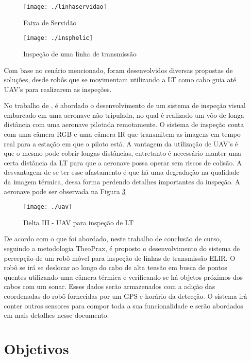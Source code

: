 \begin{figure}[!ht]
	\centering
	\texttt{[image: ./linhaservidao]}
	\caption{Faixa de Servidão} \label{linhaservidao}
\end{figure}

\begin{figure}[!ht]
	\centering
	\texttt{[image: ./insphelic]}
	\caption{Inspeção de uma linha de transmissão} \label{lineinspection}
\end{figure}

Com base no cenário mencionado, foram desenvolvidos diversas propostas de soluções, desde robôs que se movimentam utilizando a LT como cabo guia até UAV's para realizarem as inspeções.

No trabalho de , é abordado o desenvolvimento de um sistema de inspeção visual embarcado em uma aeronave não tripulada, no qual é realizado um vôo de longa distância com uma aeronave pilotada remotamente. O sistema de inspeção conta com uma câmera RGB e uma câmera IR que transmitem as imagens em tempo real para a estação em que o piloto está. A vantagem da utilização de UAV's é que o mesmo pode cobrir longas distâncias, entretanto é necessário manter uma certa distância da LT para que a aeronave possa operar sem riscos de colisão. A desvantagem de se ter esse afastamento é que há uma degradação na qualidade da imagem térmica, dessa forma perdendo detalhes importantes da inspeção. A aeronave pode ser observada na Figura \ref{uav}
\begin{figure}[!ht]
	\centering
	\texttt{[image: ./uav]}
	\caption{Delta III - UAV para inspeção de LT} \label{uav}
\end{figure}

De acordo com o que foi abordado, neste trabalho de conclusão de curso, seguindo a metodologia TheoPrax, é proposto o desenvolvimento do sistema de percepção de um robô móvel para inspeção de linhas de transmissão ELIR. O robô se irá se deslocar ao longo do cabo de alta tensão em busca de pontos quentes utilizando uma câmera térmica e verificando se há objetos próximos dos cabos com um sonar. Esses dados serão armazenados com a adição das coordenadas do robô fornecidas por um GPS e horário da detecção. O sistema irá conter outros sensores para compor toda a sua funcionalidade e serão abordados em mais detalhes nesse documento.


\section{Objetivos}
\label{sec:obj}

